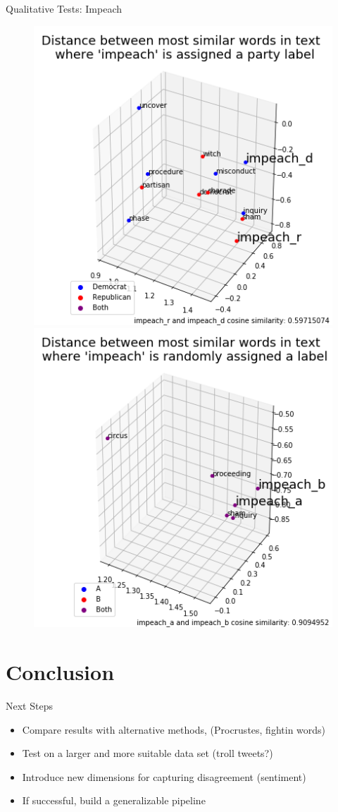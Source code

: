 \documentclass[10pt]{beamer}
\begin{document}
\begin{frame}{Qualitative Tests: Impeach}
      \begin{figure}
    \includegraphics[width=.475\textwidth]{impeach_party.png}
    \includegraphics[width=.475\textwidth]{impeach_random.png}
  \end{figure}
\end{frame}


\section{Conclusion}

\begin{frame}{Next Steps}
    \begin{itemize}
        \item Compare results with alternative methods, (Procrustes, fightin words)
        \item Test on a larger and more suitable data set (troll tweets?)
        \item Introduce new dimensions for capturing disagreement (sentiment)
        \item If successful, build a generalizable pipeline
    \end{itemize}
\end{frame}
\end{document}
